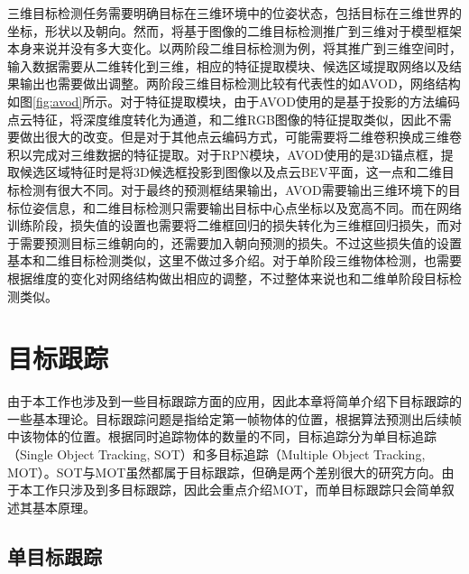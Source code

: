 三维目标检测任务需要明确目标在三维环境中的位姿状态，包括目标在三维世界的坐标，形状以及朝向。然而，将基于图像的二维目标检测推广到三维对于模型框架本身来说并没有多大变化。以两阶段二维目标检测为例，将其推广到三维空间时，输入数据需要从二维转化到三维，相应的特征提取模块、候选区域提取网络以及结果输出也需要做出调整。两阶段三维目标检测比较有代表性的如AVOD\cite{ku2018joint}，网络结构如图\ref{fig:avod}所示。对于特征提取模块，由于AVOD使用的是基于投影的方法编码点云特征，将深度维度转化为通道，和二维RGB图像的特征提取类似，因此不需要做出很大的改变。但是对于其他点云编码方式，可能需要将二维卷积换成三维卷积以完成对三维数据的特征提取。对于RPN模块，AVOD使用的是3D锚点框，提取候选区域特征时是将3D候选框投影到图像以及点云BEV平面，这一点和二维目标检测有很大不同。对于最终的预测框结果输出，AVOD需要输出三维环境下的目标位姿信息，和二维目标检测只需要输出目标中心点坐标以及宽高不同。而在网络训练阶段，损失值的设置也需要将二维框回归的损失转化为三维框回归损失，而对于需要预测目标三维朝向的，还需要加入朝向预测的损失。不过这些损失值的设置基本和二维目标检测类似，这里不做过多介绍。对于单阶段三维物体检测，也需要根据维度的变化对网络结构做出相应的调整，不过整体来说也和二维单阶段目标检测类似。

%
%

\section{目标跟踪}
\label{object_tracking}
由于本工作也涉及到一些目标跟踪方面的应用，因此本章将简单介绍下目标跟踪的一些基本理论。目标跟踪问题是指给定第一帧物体的位置，根据算法预测出后续帧中该物体的位置。根据同时追踪物体的数量的不同，目标追踪分为单目标追踪（Single Object Tracking, SOT）和多目标追踪（Multiple Object Tracking, MOT）。SOT与MOT虽然都属于目标跟踪，但确是两个差别很大的研究方向。由于本工作只涉及到多目标跟踪，因此会重点介绍MOT，而单目标跟踪只会简单叙述其基本原理。

\subsection{单目标跟踪}
\label{single_tracking}


